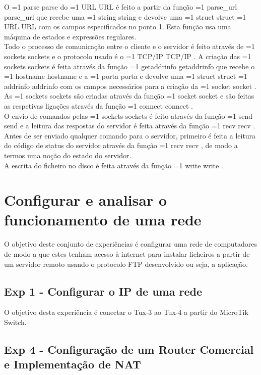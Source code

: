 \documentclass[11pt,a4paper,twocolumn]{article}
\newcommand{\hl}[2][1]{%
  \ifnum#1=1\relax
    \textcolor{text-hl1}{#2}%
  \else
    \textcolor{text-hl2}{#2}%
  \fi
}
\begin{document}
O \hl{parse} do \hl{URL} é feito a partir da função \hl[2]{parse\_url} que recebe uma \hl[2]{string} e devolve uma \hl[2]{struct} \hl{URL} com os campos especificados no ponto 1. Esta função usa uma máquina de estados e expressões regulares. \\
Todo o processo de comunicação entre o cliente e o servidor é feito através de \hl{sockets} e o protocolo usado é o \hl{TCP/IP}. A criação das \hl{sockets} é feita através da função \hl[2]{getaddrinfo} que recebe o \hl[2]{hostname} e a \hl[2]{porta} e devolve uma \hl[2]{struct} \hl{addrinfo} com os campos necessários para a criação da \hl{socket}. \\
As \hl[2]{sockets} são criadas através da função \hl{socket} e são feitas as respetivas ligações através da função \hl[2]{connect}. \\  
O envio de comandos pelas \hl[2]{sockets} é feito através da função \hl[2]{send} e a leitura das respostas do servidor é feita através da função \hl[2]{recv}. \\
Antes de ser enviado qualquer comando para o servidor, primeiro é feita a leitura do código de status do servidor através da função \hl[2]{recv}, de modo a termos uma noção do estado do servidor. \\
A escrita do ficheiro no disco é feita através da função \hl[2]{write}. \\

\section{Configurar e analisar o funcionamento de uma rede}

O objetivo deste conjunto de experiências é configurar uma rede de computadores de modo a que estes tenham acesso à internet para instalar ficheiros a partir de um servidor remoto usando o protocolo FTP desenvolvido ou seja, a aplicação.

\subsection{Exp 1 - Configurar o IP de uma rede}

O objetivo desta experiência é conectar o Tux-3 ao Tux-4 a partir do MicroTik Switch.





\subsection{Exp 4 - Configuração de um Router Comercial e Implementação de NAT}
\end{document}
